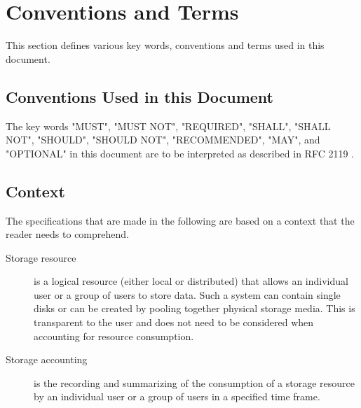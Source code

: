 \section{Conventions and Terms}

This section defines various key words, conventions and terms used in this document.

\subsection{Conventions Used in this Document}
The key words "MUST", "MUST NOT", "REQUIRED", "SHALL", "SHALL NOT", 
"SHOULD", "SHOULD NOT", "RECOMMENDED",  "MAY", and 
"OPTIONAL" in this document are to be interpreted as described in
RFC 2119 \cite{rfc2119}.


\subsection{Context}

The specifications that are made in the following are based on a context that
the reader needs to comprehend.

\begin{description}

\item[Storage resource] is a logical resource (either local or distributed)
that allows an individual user or a group of users to store data. Such a system
can contain single disks or can be created by pooling together physical storage
media. This is transparent to the user and does not need to be considered when
accounting for resource consumption.

\item[Storage accounting] is the recording and summarizing of the consumption
of a storage resource by an individual user or a group of users in a specified
time frame.

\end{description}


